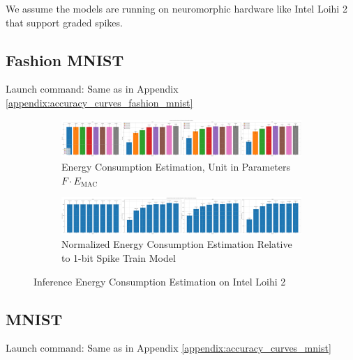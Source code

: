     We assume the models are running on neuromorphic hardware like Intel Loihi 2 that support graded spikes. 

    \subsection{Fashion MNIST}
    \label{appendix:energy_neuromorphic_fashion_mnist}
        Launch command: Same as in Appendix \ref{appendix:accuracy_curves_fashion_mnist}

        \begin{figure}[H]
            \centering
            \begin{subfigure}[H]{\textwidth}
                \includegraphics[width=\textwidth]{../standard/FashionMNIST/plots/fashionmnist_test_energy_nh.pdf}
                \caption{Energy Consumption Estimation, Unit in Parameters $F\cdot E_{\text{MAC}}$}
            \end{subfigure}
            \hfill
            \begin{subfigure}[H]{\textwidth}
                \includegraphics[width=\textwidth]{../standard/FashionMNIST/plots/fashionmnist_test_relative_energy_nh.pdf}
                \caption{Normalized Energy Consumption Estimation Relative to 1-bit Spike Train Model}
            \end{subfigure}
            \caption{Inference Energy Consumption Estimation on Intel Loihi 2}
        \end{figure}
    
    \subsection{MNIST}
    \label{appendix:energy_neuromorphic_mnist}
        Launch command: Same as in Appendix \ref{appendix:accuracy_curves_mnist}

